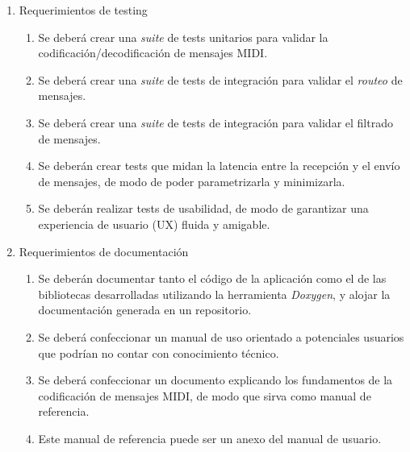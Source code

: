 \documentclass[
11pt, %
]{charter}
\begin{document}
\begin{enumerate}
	\item Requerimientos de testing
	\begin{enumerate}
		\item Se deberá crear una \emph{suite} de tests unitarios para validar la codificación/decodificación de mensajes MIDI.
		\item Se deberá crear una \emph{suite} de tests de integración para validar el \emph{routeo} de mensajes.
		\item Se deberá crear una \emph{suite} de tests de integración para validar el filtrado de mensajes.
		\item Se deberán crear tests que midan la latencia entre la recepción y el envío de mensajes, de modo de poder parametrizarla y minimizarla.
		\item Se deberán realizar tests de usabilidad, de modo de garantizar una experiencia de usuario (UX) fluida y amigable.
	\end{enumerate}
	\item Requerimientos de documentación
	\begin{enumerate}
		\item Se deberán documentar tanto el código de la aplicación como el de las bibliotecas desarrolladas utilizando la herramienta \emph{Doxygen}, y alojar la documentación generada en un repositorio.
		\item Se deberá confeccionar un manual de uso orientado a potenciales usuarios que podrían no contar con conocimiento técnico.
		\item Se deberá confeccionar un documento explicando los fundamentos de la codificación de mensajes MIDI, de modo que sirva como manual de referencia.
		\item Este manual de referencia puede ser un anexo del manual de usuario.
	\end{enumerate}


\end{enumerate}
\end{document}
